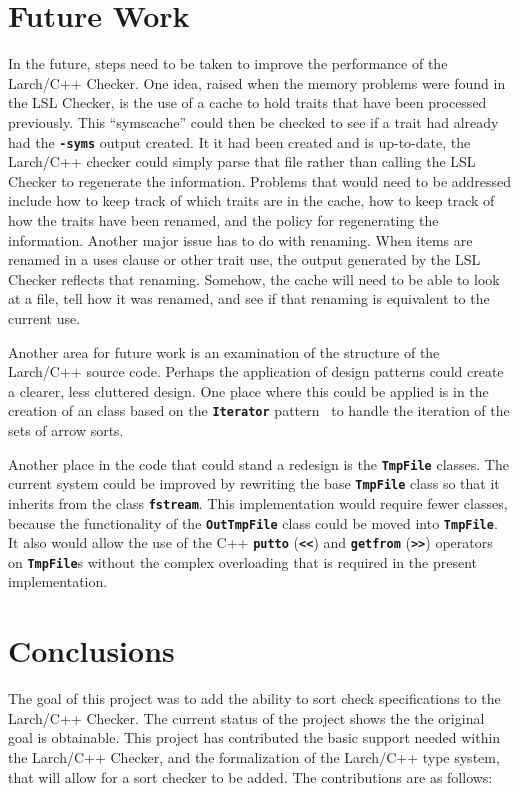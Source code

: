 \documentclass[12pt]{article} %
\newcommand{\reserved}[1]{\textbf{\texttt{#1}}} %
\begin{document}
\section{Future Work}
\label{futwork}
In the future, steps need to be taken to improve the performance of
the Larch/C++ Checker. One idea, raised when the memory problems were
found in the LSL Checker, is the use of a cache to hold traits that
have been processed previously. This ``symscache'' could then be
checked to see if a trait had already had the \reserved{-syms} output
created. It it had been created and is up-to-date, the Larch/C++
checker could simply parse that file rather than calling the LSL
Checker to regenerate the information. Problems that would need to be
addressed include how to keep track of which traits are in the cache,
how to keep track of how the traits have been renamed, and the policy
for regenerating the information. Another major issue has to do with
renaming. When items are renamed in a uses clause or other trait use,
the output generated by the LSL Checker reflects that
renaming. Somehow, the cache will need to be able to look at a file,
tell how it was renamed, and see if that renaming is equivalent to the
current use.

Another area for future work is an examination of the structure of the
Larch/C++ source code. Perhaps the application of design patterns
could create a clearer, less cluttered design. One place where this
could be applied is in the creation of an class based on the
\reserved{Iterator} pattern~\cite{Gamma-Helm-Johnson-Vlissides95} to
handle the iteration of the sets of arrow sorts.

Another place in the code that could stand a redesign is the
\reserved{TmpFile} classes. The current system could be improved by
rewriting the base \reserved{TmpFile} class so that it inherits from
the class \reserved{fstream}. This implementation would require fewer
classes, because the functionality of the \reserved{OutTmpFile} class
could be moved into \reserved{TmpFile}. It also would allow the use of
the C++ \reserved{putto} (\reserved{<<}) and \reserved{getfrom}
(\reserved{>>}) operators on \reserved{TmpFile}s without the complex
overloading that is required in the present implementation.

\section{Conclusions}
The goal of this project was to add the ability to sort check
specifications to the Larch/C++ Checker. The current status of the
project shows the the original goal is obtainable. This project has
contributed the basic support needed within the Larch/C++ Checker, and
the formalization of the Larch/C++ type system, that will allow for a
sort checker to be added. The contributions are as follows:
\end{document}
